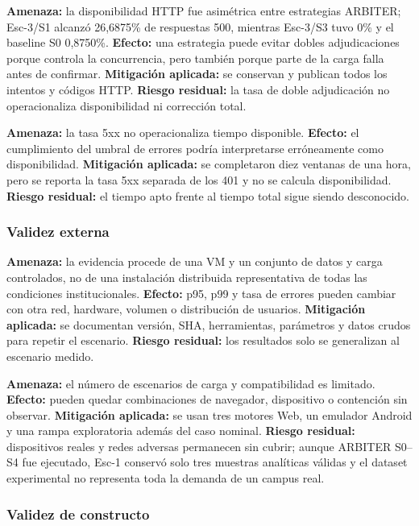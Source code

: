 \textbf{Amenaza:} la disponibilidad HTTP fue asimétrica entre estrategias
ARBITER; Esc-3/S1 alcanzó 26,6875\% de respuestas 500, mientras Esc-3/S3 tuvo
0\% y el baseline S0 0,8750\%. \textbf{Efecto:} una estrategia puede evitar
dobles adjudicaciones porque controla la concurrencia, pero también porque parte
de la carga falla antes de confirmar. \textbf{Mitigación aplicada:} se conservan
y publican todos los intentos y códigos HTTP. \textbf{Riesgo residual:} la tasa
de doble adjudicación no operacionaliza disponibilidad ni corrección total.

\textbf{Amenaza:} la tasa 5xx no operacionaliza tiempo disponible.
\textbf{Efecto:} el cumplimiento del umbral de errores podría interpretarse
erróneamente como disponibilidad. \textbf{Mitigación aplicada:} se completaron
diez ventanas de una hora, pero se reporta la tasa 5xx separada de los 401 y no
se calcula disponibilidad. \textbf{Riesgo residual:} el tiempo apto frente al
tiempo total sigue siendo desconocido.

\subsubsection{Validez externa}

\textbf{Amenaza:} la evidencia procede de una VM y un conjunto de datos y carga
controlados, no de una instalación distribuida representativa de todas las
condiciones institucionales. \textbf{Efecto:} p95, p99 y tasa de errores pueden
cambiar con otra red, hardware, volumen o distribución de usuarios.
\textbf{Mitigación aplicada:} se documentan versión, SHA, herramientas,
parámetros y datos crudos para repetir el escenario. \textbf{Riesgo residual:}
los resultados solo se generalizan al escenario medido.

\textbf{Amenaza:} el número de escenarios de carga y compatibilidad es limitado.
\textbf{Efecto:} pueden quedar combinaciones de navegador, dispositivo o
contención sin observar. \textbf{Mitigación aplicada:} se usan tres motores Web,
un emulador Android y una rampa exploratoria además del caso nominal.
\textbf{Riesgo residual:} dispositivos reales y redes adversas permanecen sin
cubrir; aunque ARBITER S0--S4 fue ejecutado, Esc-1 conservó solo tres muestras
analíticas válidas y el dataset experimental no representa toda la demanda de
un campus real.

\subsubsection{Validez de constructo}

